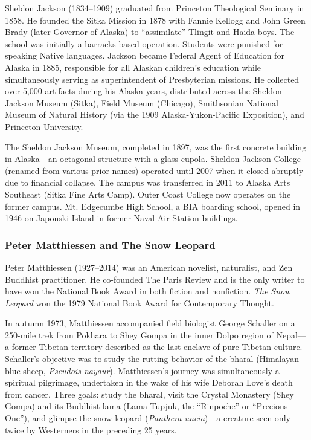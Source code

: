 \documentclass[11pt,letterpaper]{article}
\begin{document}
Sheldon Jackson (1834--1909) graduated from Princeton Theological Seminary in 1858. He founded the Sitka Mission in 1878 with Fannie Kellogg and John Green Brady (later Governor of Alaska) to ``assimilate'' Tlingit and Haida boys. The school was initially a barracks-based operation. Students were punished for speaking Native languages. Jackson became Federal Agent of Education for Alaska in 1885, responsible for all Alaskan children's education while simultaneously serving as superintendent of Presbyterian missions. He collected over 5,000 artifacts during his Alaska years, distributed across the Sheldon Jackson Museum (Sitka), Field Museum (Chicago), Smithsonian National Museum of Natural History (via the 1909 Alaska-Yukon-Pacific Exposition), and Princeton University.

The Sheldon Jackson Museum, completed in 1897, was the first concrete building in Alaska---an octagonal structure with a glass cupola. Sheldon Jackson College (renamed from various prior names) operated until 2007 when it closed abruptly due to financial collapse. The campus was transferred in 2011 to Alaska Arts Southeast (Sitka Fine Arts Camp). Outer Coast College now operates on the former campus. Mt. Edgecumbe High School, a BIA boarding school, opened in 1946 on Japonski Island in former Naval Air Station buildings.

\subsubsection{Peter Matthiessen and The Snow Leopard}
Peter Matthiessen (1927--2014) was an American novelist, naturalist, and Zen Buddhist practitioner. He co-founded The Paris Review and is the only writer to have won the National Book Award in both fiction and nonfiction. \textit{The Snow Leopard} won the 1979 National Book Award for Contemporary Thought.

In autumn 1973, Matthiessen accompanied field biologist George Schaller on a 250-mile trek from Pokhara to Shey Gompa in the inner Dolpo region of Nepal---a former Tibetan territory described as the last enclave of pure Tibetan culture. Schaller's objective was to study the rutting behavior of the bharal (Himalayan blue sheep, \textit{Pseudois nayaur}). Matthiessen's journey was simultaneously a spiritual pilgrimage, undertaken in the wake of his wife Deborah Love's death from cancer. Three goals: study the bharal, visit the Crystal Monastery (Shey Gompa) and its Buddhist lama (Lama Tupjuk, the ``Rinpoche'' or ``Precious One''), and glimpse the snow leopard (\textit{Panthera uncia})---a creature seen only twice by Westerners in the preceding 25 years.
\end{document}
